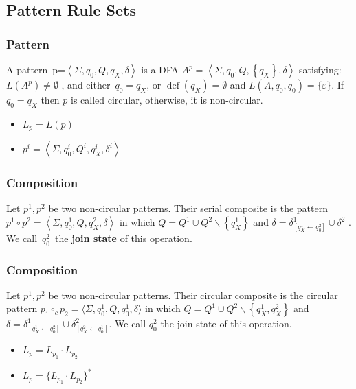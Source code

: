 \documentclass[aspectratio=169%
,serif,mathserif]{beamer}
\begin{document}
\subsection{Pattern Rule Sets}
\begin{frame}
	\frametitle{Pattern}
	\begin{definition}[Patterns]
		A pattern~p=$\left\langle\Sigma, q_{0}, Q, q_{X}, \delta\right\rangle$  
		is a DFA  $A^{p}= \left\langle\Sigma, q_{0}, Q,\left\{q_{X}\right\}, \delta\right\rangle$  
		satisfying: $L\left(A^{p}\right) \neq \emptyset$ , and either~$q_{0}=q_{X} $, or 
		$\operatorname{def}\left(q_{X}\right)=\emptyset$ and $L\left(A, q_{0}, q_{0}\right)=\{\varepsilon\} $.  If $q_{0}=q_{X}$ then $ p$ is called circular, otherwise, it is non-circular.
	\end{definition}
	\begin{itemize}
		\item  $L_p  = L(p)$
		\item $p^i =\left\langle\Sigma, q_{0}^i, Q^i, q_{X}^i, \delta^i\right\rangle$  
	\end{itemize}
\end{frame}

\begin{frame}
	\frametitle{Composition}
	\begin{definition}
		Let $p^{1}, p^{2}$ be two non-circular patterns. 
		Their serial composite is the pattern $p^{1} \circ p^{2}=\left\langle\Sigma, 
		q_{0}^{1}, Q, q_{X}^{2}, \delta\right\rangle$ 
		in which  $Q = Q^{1} \cup Q^{2} \backslash\left\{q_{X}^{1}\right\}$ and
		$\delta=\delta_{\left[q_{X}^{1}\leftarrow q_{0}^{2}\right]}^{1} \cup \delta^{2}$ . 
		We call~$q_{0}^{2}$~the \textbf{join state} of this operation.
	\end{definition}

\end{frame}

\begin{frame}
	\frametitle{Composition}
	\begin{definition}
	Let  $p^{1}, p^{2}$ be two non-circular patterns. 
	Their circular composite is the circular pattern $p_{1} \circ_{c} p_{2}=\langle\Sigma, q_{0}^{1}, Q, q_{0}^{1}, \delta\rangle$  
	in which  $Q=Q^{1} \cup Q^{2} \backslash\left\{q_{X}^{1}, q_{X}^{2}\right\}$ 
	and $\delta=\delta_{\left[q_{X}^{1} \leftarrow q_{0}^{2}\right]}^{1} \cup \delta_{[q_{X}^{2} \leftarrow q_{0}^{1}]}^{2}$.
	We call  $q_{0}^{2}$  the join state of this operation.
	\end{definition}

	\begin{itemize}
		\item $L_p = L_{p_1} \cdot L_{p_2}$
		\item $L_p = \{L_{p_1} \cdot L_{p_2}\}^{*}$
	\end{itemize}
\end{frame}
\end{document}
